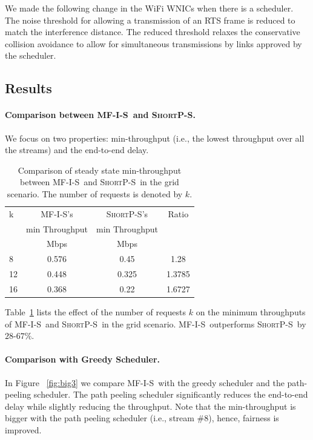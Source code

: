 \documentclass[12pt]{article}
\newenvironment{proof sketch}[1]{\noindent {\emph{Proof sketch of #1:}}}{\hfill \qed}
\newcommand{\algA}{\textsc{MF-I-S}}
\newcommand{\algBS}{\textsc{ShortP-S}}
\begin{document}
We made the following change in the WiFi WNICs when there is a
scheduler. The noise threshold for allowing a transmission of an RTS
frame is reduced to match the interference distance. The reduced
threshold relaxes the conservative collision avoidance to allow for
simultaneous transmissions by links approved by the scheduler.

\subsection{Results}

\paragraph{Comparison between \algA\ and \algBS .}
We focus on two properties: min-throughput (i.e., the lowest throughput
over all the streams) and the end-to-end delay.
\begin{table}
\centering \scriptsize
\begin{tabular}{|| l || c | c | c ||}
\hline
k & \algA 's            & \algBS 's & Ratio\\
    &  min Throughput   & min Throughput & \\
\hline
& Mbps & Mbps & \\
\hline\hline
8 & 0.576 & 0.45  & 1.28  \\
12 & 0.448 & 0.325 & 1.3785 \\
16 & 0.368  & 0.22 & 1.6727 \\
\hline
\end{tabular}
\caption{Comparison of steady state min-throughput between \algA\ and \algBS\ in the
  grid scenario.  The number of requests is denoted by $k$. }
\label{tab:minthroughput}
\end{table}

Table~\ref{tab:minthroughput} lists the effect of the number of
requests $k$  on the minimum throughputs of \algA\ and \algBS\ in the
grid scenario.  \algA\ outperforms \algBS\ by $28$-$67\%$.

\paragraph{Comparison with Greedy Scheduler.}
In Figure%
~\ref{fig:big3} we compare \algA\ with the greedy scheduler
and the path-peeling scheduler.  The path peeling scheduler
significantly reduces the end-to-end delay while slightly reducing the
throughput. Note that the min-throughput is bigger with the
path peeling scheduler (i.e., stream \#8), hence, fairness is
improved.
\end{document}
